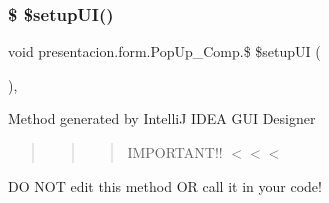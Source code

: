 \subsubsection{\texorpdfstring{\$ \$setup\+U\+I()}{$ $setupUI()}}
{\footnotesize\ttfamily void presentacion.\+form.\+Pop\+Up\+\_\+\+Comp.\$ \$setup\+UI (\begin{DoxyParamCaption}{ }\end{DoxyParamCaption})\hspace{0.3cm}{\ttfamily [inline]}, {\ttfamily [private]}}

Method generated by IntelliJ I\+D\+EA G\+UI Designer \begin{quote}
\begin{quote}
\begin{quote}
I\+M\+P\+O\+R\+T\+A\+N\+T!! $<$$<$$<$ \end{quote}
\end{quote}
\end{quote}
DO N\+OT edit this method OR call it in your code!

